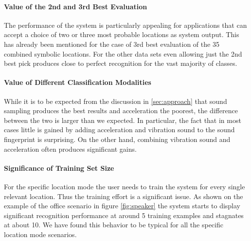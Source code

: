 \paragraph{Value of the 2nd and 3rd Best Evaluation}
The performance of the system is particularly appealing for
applications that can accept a choice of two or three most probable
locations as system output. This has already been mentioned for the
case of 3rd best evaluation of the 35 combined symbolic locations. For
the other data sets even allowing just the 2nd best pick produces
close to perfect recognition for the vast majority of classes.

\paragraph{Value of Different Classification Modalities}
While it is to be expected from the discussion in \ref{sec:approach}
that sound sampling produces the best results and acceleration
the poorest, the difference between the two is larger than we
expected. In particular, the fact that in most cases little is gained
by adding acceleration and vibration sound to the sound fingerprint is
surprising. On the other hand, combining vibration sound and
acceleration often produces significant gains.


\paragraph{Significance of Training Set Size}
For the specific location mode the user needs to train the system for
every single relevant location. Thus the training effort is a
significant issue. As shown on the example of the office scenario in
figure \ref{fig:speaker} the system starts to display significant
recognition performance at around 5 training examples and stagnates at
about 10. We have found this behavior to be typical for all the
specific location mode scenarios. 


